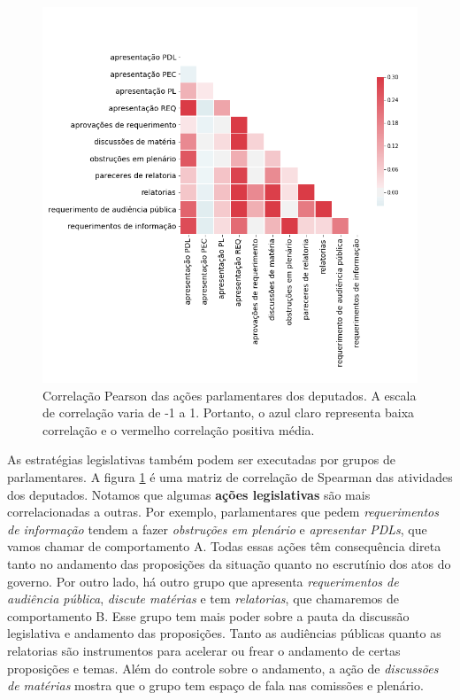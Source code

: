 \documentclass[12pt,a4paper]{article}
\begin{document}
\begin{figure}[H]
\centering
\includegraphics[width=1.0\textwidth]{graficos/camara/atividade/plot_corr_relatorias_deputados.png}
\caption{Correlação Pearson das ações parlamentares dos deputados. A escala de correlação varia de -1 a 1. Portanto, o azul claro representa baixa correlação e o vermelho correlação positiva média.}
\label{fig:atividade-parlamentar-corr}
\end{figure} 

As estratégias legislativas também podem ser executadas por grupos de parlamentares. A figura \ref{fig:atividade-parlamentar-corr} é uma matriz de correlação de Spearman das atividades dos deputados. Notamos que algumas \textbf{ações legislativas} são mais correlacionadas a outras. Por exemplo, parlamentares que pedem \textit{requerimentos de informação} tendem a fazer \textit{obstruções em plenário} e \textit{apresentar PDLs}, que vamos chamar de comportamento A. Todas essas ações têm consequência direta tanto no andamento das proposições da situação quanto no escrutínio dos atos do governo. Por outro lado, há outro grupo que apresenta \textit{requerimentos de audiência pública}, \textit{discute matérias} e tem \textit{relatorias}, que chamaremos de comportamento B. Esse grupo tem mais poder sobre a pauta da discussão legislativa e andamento das proposições. Tanto as audiências públicas quanto as relatorias são instrumentos para acelerar ou frear o andamento de certas proposições e temas. Além do controle sobre o andamento, a ação de \textit{discussões de matérias} mostra que o grupo tem espaço de fala nas comissões e plenário.
\end{document}
